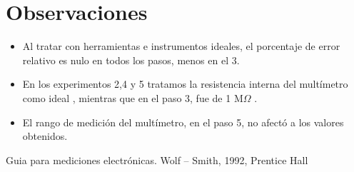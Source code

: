 \documentclass[twoside,twocolumn]{article}
\begin{document}
\section{Observaciones}
\begin{itemize}
\item Al tratar con herramientas e instrumentos ideales, el porcentaje de error relativo es nulo en todos los pasos, menos en el 3.
\item En los experimentos 2,4 y 5 tratamos la resistencia interna del multímetro como ideal , mientras que en el paso 3, fue de 1 M$\Omega$ .
\item El rango de medición del multímetro, en el paso 5, no afectó a los valores obtenidos.
\end{itemize}

\newpage
\begin{thebibliography}{99} %

 Guia para mediciones electrónicas.
Wolf – Smith, 1992, Prentice Hall
 
\end{thebibliography}

\end{document}

